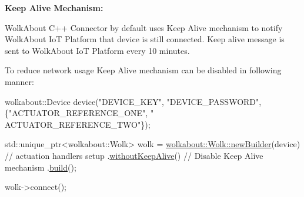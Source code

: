 {\bfseries Keep Alive Mechanism\+:}

Wolk\+About C++ Connector by default uses Keep Alive mechanism to notify Wolk\+About IoT Platform that device is still connected. Keep alive message is sent to Wolk\+About IoT Platform every 10 minutes.

To reduce network usage Keep Alive mechanism can be disabled in following manner\+:


\begin{DoxyCode}
wolkabout::Device device(\textcolor{stringliteral}{"DEVICE\_KEY"}, \textcolor{stringliteral}{"DEVICE\_PASSWORD"}, \{\textcolor{stringliteral}{"ACTUATOR\_REFERENCE\_ONE"}, \textcolor{stringliteral}{"
      ACTUATOR\_REFERENCE\_TWO"}\});

std::unique\_ptr<wolkabout::Wolk> wolk =
  \hyperlink{classwolkabout_1_1_wolk_a91270bb8552c2dee634e552111db4bb0}{wolkabout::Wolk::newBuilder}(device)
    \textcolor{comment}{// actuation handlers setup}
    .\hyperlink{classwolkabout_1_1_wolk_builder_a22893971f31f5dccb5dec0690324a038}{withoutKeepAlive}() \textcolor{comment}{// Disable Keep Alive mechanism}
    .\hyperlink{classwolkabout_1_1_wolk_builder_aad4c9b0c925a023cf670dc2fdc6631f3}{build}();

    wolk->connect();
\end{DoxyCode}
 